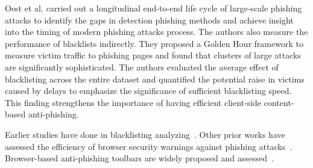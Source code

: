 



Oest et al.\cite{oest2020sunrise} carried out a longitudinal end-to-end life cycle of large-scale phishing attacks to identify the gaps in detection phishing methods and achieve insight into the timing of modern phishing attacks process. The authors also measure the performance of blacklists indirectly. 
They proposed a Golden Hour framework to measure victim traffic to phishing pages and found that clusters of large attacks are significantly sophisticated.
The authors evaluated the average effect of blacklisting across the entire dataset and quantified the potential raise in victims caused by delays to emphasize the significance of sufficient blacklisting speed. This finding strengthens the importance of having efficient client-side content-based anti-phishing.



Earlier studies have done in blacklisting analyzing~\cite{virvilis2014mobile,abrams2013browser,sheng2009empirical}.
Other prior works have assessed the efficiency of browser security warnings against phishing attacks~\cite{akhawe2013alice,egelman2008you,dhamija2006phishing,sunshine2009crying}. Browser-based anti-phishing toolbars are widely proposed and assessed~\cite{tsalis2014browser,huang2009browser,mazher2013web,yue2008anti,marchal2017off}.


